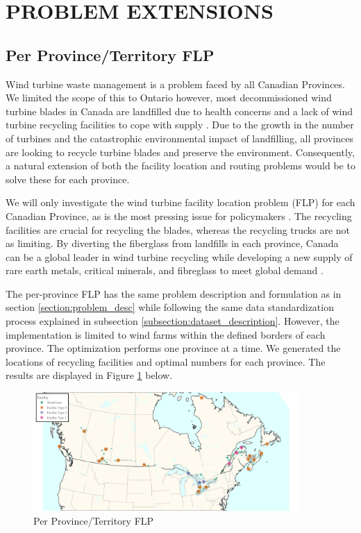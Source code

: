\section{PROBLEM EXTENSIONS}



\subsection{Per Province/Territory FLP}
Wind turbine waste management is a problem faced by all Canadian Provinces. We limited the scope of this to Ontario however, most decommissioned wind turbine blades in Canada are landfilled due to health concerns and a lack of wind turbine recycling facilities to cope with supply \cite{RN12}  \cite{RN1}.  Due to the growth in the number of turbines and the catastrophic environmental impact of landfilling, all provinces are looking to recycle turbine blades and preserve the environment.  Consequently, a natural extension of both the facility location and routing problems would be to solve these for each province.  

We will only investigate the wind turbine facility location problem (FLP) for each Canadian Province, as is the most pressing issue for policymakers \cite{RN14}. The recycling facilities are crucial for recycling the blades, whereas the recycling trucks are not as limiting. By diverting the fiberglass from landfills in each province, Canada can be a global leader in wind turbine recycling while developing a new supply of rare earth metals, critical minerals, and fibreglass to meet global demand \cite{RN17}.

The per-province FLP has the same problem description and formulation as in section \ref{section:problem_desc} while following the same data standardization process explained in subsection \ref{subsection:dataset_description}. However, the implementation is limited to wind farms within the defined borders of each province. The optimization performs one province at a time. We generated the locations of recycling facilities and optimal numbers for each province. The results are displayed in Figure \ref{fig:fig_pbp} below. 

\begin{figure} [h]
    \centering
    \includegraphics[width=0.9\textwidth]{graphics/fig_pbp.jpeg}
    \caption{Per Province/Territory FLP}
    \label{fig:fig_pbp}
\end{figure}

